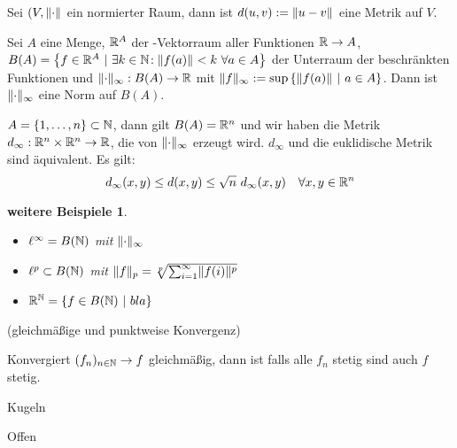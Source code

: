 \begin{stz}
    Sei $(V, \norm{\cdot}$ ein normierter Raum, dann ist $d(u,v) := \norm{u - v}$
    eine Metrik auf $V$.
\end{stz}

\begin{dfn}
    Sei $A$ eine Menge, $\mathbb{R}^A$ der \R-Vektorraum aller Funktionen $\mathbb{R} \to A$,
    $B(A) = \mdef[f\in\R^A]{\exists k\in\N\!: \norm{f(a)} < k \ \forall a \in A}$
    der Unterraum der beschränkten Funktionen und $\supnorm{\cdot}: B(A) \to \R$
    mit $\supnorm{f} := \sup \mdef[\norm{f(a)}]{a\in A}$. Dann ist
    $\supnorm{\cdot}$ eine Norm auf $B(A)$.
\end{dfn}

\begin{bsp}
    $A = \mdef{1,\ldots,n}\subset \N$, dann gilt $B(A) = \mathbb{R}^n$ und wir haben
    die Metrik $d_\infty: \mathbb{R}^n \times \mathbb{R}^n \to \mathbb{R}$, die von $\supnorm{\cdot}$
    erzeugt wird. $d_\infty$ und die euklidische Metrik sind äquivalent.
    Es gilt:
    \[d_\infty(x,y) \le d(x,y) \le \sqrt{n}\ d_\infty(x,y) \quad \forall x,y\in\R^n\]
\end{bsp}

\newtheorem{wbsp}[dfn]{weitere Beispiele}
\begin{wbsp}
    \begin{itemize}
        \item $\ell^\infty = B(\mathbb{N})$ mit $\supnorm{\cdot}$
        \item $\ell^p \subset B(\mathbb{N})$ mit
                $\norm[p]{f} = \sqrt[p]{\sum^\infty_{i=1} \norm{f(i)}^p}$
        \item $\R^\N = \mdef[f \in B(\N)]{bla}$
    \end{itemize}
\end{wbsp}

\begin{dfn}
    (gleichmäßige und punktweise Konvergenz)
\end{dfn}

\begin{stz}
    Konvergiert $(f_n)_{n\in\mathbb{N}} \to f$ gleichmäßig, dann ist falls alle $f_n$
    stetig sind auch $f$ stetig.
\end{stz}

\begin{dfn}
    Kugeln
\end{dfn}

\begin{dfn}
    Offen
\end{dfn}

